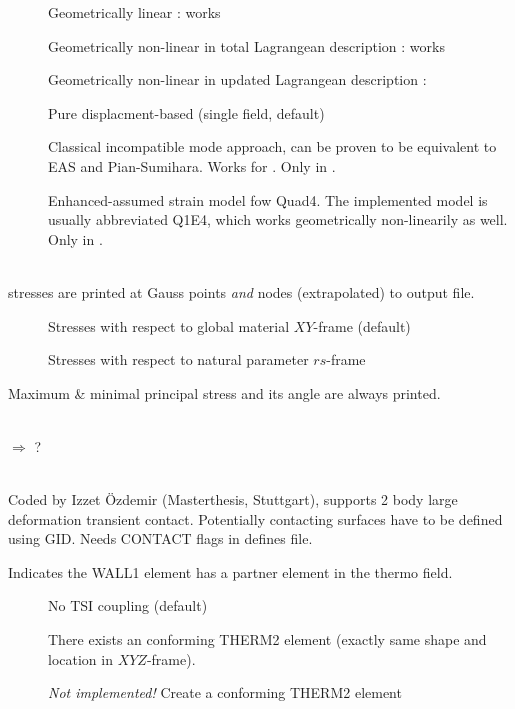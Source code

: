 \begin{description}
\item[] Geometrically linear : works
\item[] Geometrically non-linear in total Lagrangean
  description : works
\item[] Geometrically non-linear in updated Lagrangean
  description : 
\end{description}

\begin{description}
\item[] Pure displacment-based (single field, default)
\item[] Classical incompatible mode approach, can be
  proven to be equivalent to EAS and Pian-Sumihara. Works for
  . Only in \ccarat{}.
\item[] Enhanced-assumed strain model fow Quad4. The
   implemented model is usually abbreviated Q1E4, which works geometrically
   non-linearily as well. Only in \baci{}.
\end{description}

\\
stresses are printed at Gauss points \emph{and} nodes (extrapolated) to
 output file.
\begin{description}
\item[] Stresses with respect to global material $XY$-frame (default)
\item[] Stresses with respect to natural parameter $rs$-frame
\end{description}
Maximum \& minimal principal stress and its angle are always printed.

\\
$\Longrightarrow$ ?

\\
Coded by Izzet \"Ozdemir (Masterthesis, Stuttgart), supports 2 body large deformation
transient contact. Potentially contacting surfaces have to be defined using GID.
Needs CONTACT flags in defines file.


Indicates the WALL1 element has a partner element in the thermo field. 
\begin{description}
\item[] No TSI coupling (default)
\item[] There exists an conforming THERM2 element
  (exactly same shape and location in $XYZ$-frame).
\item[] \emph{Not implemented!} Create a conforming THERM2 element
\end{description}

